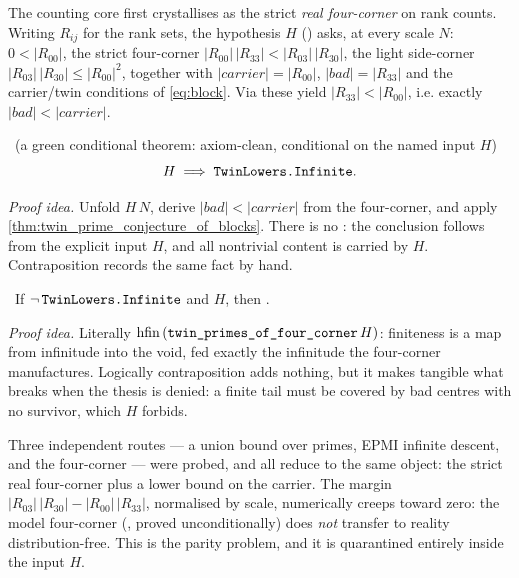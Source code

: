 The counting core first crystallises as the strict \emph{real four-corner} on rank counts. Writing
$R_{ij}$ for the rank sets, the hypothesis $H$ () asks, at every scale $N$:
$0<|R_{00}|$, the strict four-corner $|R_{00}|\,|R_{33}|<|R_{03}|\,|R_{30}|$, the light side-corner
$|R_{03}|\,|R_{30}|\le|R_{00}|^2$, together with $|\mathit{carrier}|=|R_{00}|$,
$|\mathit{bad}|=|R_{33}|$ and the carrier/twin conditions of \cref{eq:block}. Via
 these yield $|R_{33}|<|R_{00}|$, i.e. exactly
$|\mathit{bad}|<|\mathit{carrier}|$.

\begin{theorem}\label{thm:twin_primes_of_four_corner}
\green{}\ (a green conditional theorem: axiom-clean, conditional on the named input $H$)
\begin{equation}\label{eq:fourcorner}
  H\;\Longrightarrow\;\texttt{TwinLowers.Infinite}.
\end{equation}
\end{theorem}

\emph{Proof idea.} Unfold $H\,N$, derive $|\mathit{bad}|<|\mathit{carrier}|$ from the four-corner,
and apply \cref{thm:twin_prime_conjecture_of_blocks}. There is no : the conclusion follows
from the explicit input $H$, and all nontrivial content is carried by $H$. Contraposition records the
same fact by hand.

\begin{theorem}\label{thm:twin_finite_contradiction}
\green{}\ If $\neg\,\texttt{TwinLowers.Infinite}$ and  $H$, then .
\end{theorem}

\emph{Proof idea.} Literally $\mathrm{hfin}\,(\texttt{twin\_primes\_of\_four\_corner}\,H)$: finiteness is
a map from infinitude into the void, fed exactly the infinitude the four-corner manufactures.
Logically contraposition adds nothing, but it makes tangible what breaks when the thesis is
denied: a finite tail must be covered by bad centres with no survivor, which $H$ forbids.

\begin{remark}
Three independent routes --- a union bound over primes, EPMI infinite descent, and the four-corner
--- were probed, and all reduce to the same object: the strict real four-corner plus a lower bound on
the carrier. The margin $|R_{03}|\,|R_{30}|-|R_{00}|\,|R_{33}|$, normalised by scale, numerically
creeps toward zero: the model four-corner (, proved unconditionally) does
\emph{not} transfer to reality distribution-free. This is the parity problem, and it is quarantined
entirely inside the \red{} input $H$.
\end{remark}

